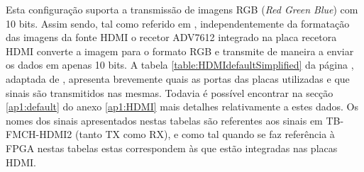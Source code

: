 Esta configuração suporta a transmissão de imagens RGB (\textit{Red Green Blue}) com 10 bits. Assim sendo, tal como referido em \cite{R009}, independentemente da formatação das imagens da fonte HDMI o recetor ADV7612 integrado na placa recetora HDMI converte a imagem para o formato RGB e transmite de maneira a enviar os dados em apenas 10 bits. A tabela \ref{table:HDMIdefaultSimplified} da página \pageref{table:HDMIdefaultSimplified}, adaptada de \cite{R009}, apresenta brevemente quais as portas das placas utilizadas e que sinais são transmitidos nas mesmas. Todavia é possível encontrar na secção \ref{ap1:default} do anexo \ref{ap1:HDMI} mais detalhes relativamente a estes dados. Os nomes dos sinais apresentados nestas tabelas são referentes aos sinais em TB-FMCH-HDMI2 (tanto TX como RX), e como tal quando se faz referência à FPGA nestas tabelas estas correspondem às que estão integradas nas placas HDMI. 

